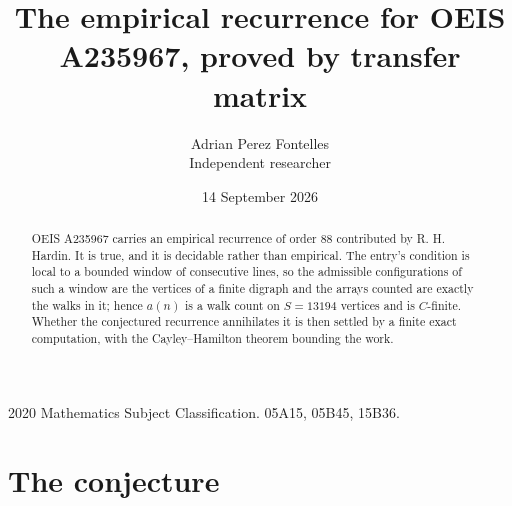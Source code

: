 \documentclass[11pt,a4paper]{article}
\title{The empirical recurrence for OEIS A235967, proved by transfer matrix}
\author{Adrian Perez Fontelles\\ \small Independent researcher}
\date{14 September 2026}
\theoremstyle{plain}
\theoremstyle{definition}
\begin{document}
\maketitle

\begin{abstract}
OEIS A235967 carries an empirical recurrence of order $88$ contributed by R. H. Hardin. It is
true, and it is decidable rather than empirical. The entry's condition is local to a bounded window of consecutive lines, so
the admissible configurations of such a window are the vertices of a finite digraph and the
arrays counted are exactly the walks in it; hence $a(n)$ is a walk count on $S=13194$ vertices
and is $C$-finite. Whether the conjectured recurrence annihilates it is then settled by a
finite exact computation, with the Cayley--Hamilton theorem bounding the work.
\end{abstract}

\noindent\small 2020 Mathematics Subject Classification. 05A15, 05B45, 15B36.\normalsize

\section{The conjecture}
\end{document}
